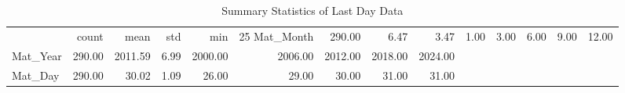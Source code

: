 \begin{table}
\caption{Summary Statistics of Last Day Data}
\label{tab:summary_last_day}
\begin{tabular}{lrrrrrrrr}
\toprule
 & count & mean & std & min & 25%
\midrule
Mat_Month & 290.00 & 6.47 & 3.47 & 1.00 & 3.00 & 6.00 & 9.00 & 12.00 \\
Mat_Year & 290.00 & 2011.59 & 6.99 & 2000.00 & 2006.00 & 2012.00 & 2018.00 & 2024.00 \\
Mat_Day & 290.00 & 30.02 & 1.09 & 26.00 & 29.00 & 30.00 & 31.00 & 31.00 \\
\bottomrule
\end{tabular}
\end{table}
